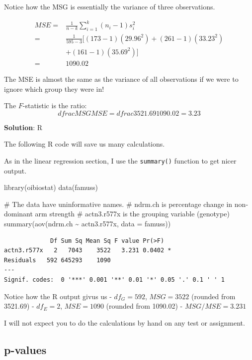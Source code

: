 \documentclass[
  letterpaper,
  DIV=11,
  numbers=noendperiod,
  oneside]{scrreprt}
\newenvironment{Shaded}{\begin{snugshade}}{\end{snugshade}}
\newcommand{\AttributeTok}[1]{\textcolor[rgb]{0.40,0.45,0.13}{#1}}
\newcommand{\CommentTok}[1]{\textcolor[rgb]{0.37,0.37,0.37}{#1}}
\newcommand{\FunctionTok}[1]{\textcolor[rgb]{0.28,0.35,0.67}{#1}}
\newcommand{\NormalTok}[1]{\textcolor[rgb]{0.00,0.23,0.31}{#1}}
\newcommand{\SpecialCharTok}[1]{\textcolor[rgb]{0.37,0.37,0.37}{#1}}
\begin{document}
Notice how the MSG is essentially the variance of three observations.

\begin{align*}
MSE =& \frac{1}{n-k}\sum_{i=1}^{k} (n_i-1)s_i^{2} \\
=& \frac{1}{595-3}[(173-1)(29.96^2) + (261-1)(33.23^2) \\&+ (161-1)(35.69^2)] \\
=& 1090.02
\end{align*}

The MSE is almost the same as the variance of all observations if we
were to ignore which group they were in!

The \(F\)-statistic is the ratio: \[
dfrac{MSG}{MSE} = dfrac{3521.69}{1090.02} = 3.23
\]

\textbf{Solution}: R

The following R code will save us many calculations.

As in the linear regression section, I use the \texttt{summary()}
function to get nicer output.

\begin{Shaded}
\begin{Highlighting}[]
\FunctionTok{library}\NormalTok{(oibiostat)}
\FunctionTok{data}\NormalTok{(famuss)}

\CommentTok{\# The data have uninformative names.}
\CommentTok{\# ndrm.ch is percentage change in non{-}dominant arm strength}
\CommentTok{\# actn3.r577x is the grouping variable (genotype)}
\FunctionTok{summary}\NormalTok{(}\FunctionTok{aov}\NormalTok{(ndrm.ch }\SpecialCharTok{\textasciitilde{}}\NormalTok{ actn3.r577x, }\AttributeTok{data =}\NormalTok{ famuss))}
\end{Highlighting}
\end{Shaded}

\begin{verbatim}
             Df Sum Sq Mean Sq F value Pr(>F)  
actn3.r577x   2   7043    3522   3.231 0.0402 *
Residuals   592 645293    1090                 
---
Signif. codes:  0 '***' 0.001 '**' 0.01 '*' 0.05 '.' 0.1 ' ' 1
\end{verbatim}

Notice how the R output givus us - \(df_G = 592\), \(MSG = 3522\)
(rounded from 3521.69) - \(df_E = 2\), \(MSE = 1090\) (rounded from
1090.02) - \(MSG / MSE = 3.231\)

I will not expect you to do the calculations by hand on any test or
assignment.

\hypertarget{p-values}{%
\subsection{p-values}\label{p-values}}
\end{document}
